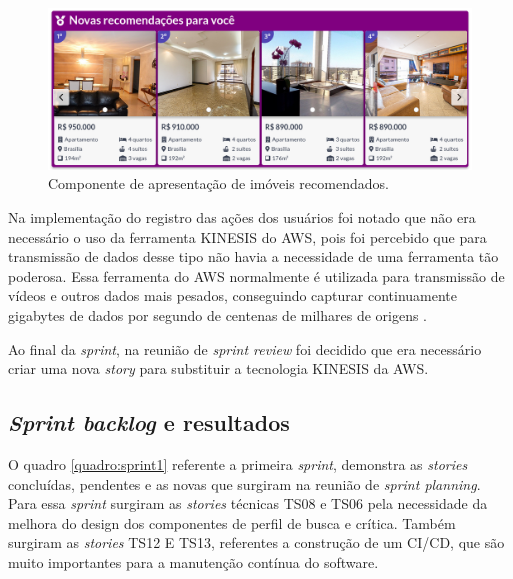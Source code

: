 \begin{figure}[H]
    \centering
    \includegraphics[scale=0.42]{figuras/desenvolvimento/componente_ml.png}
    \caption[Componente de apresentação de imóveis recomendados]{Componente de apresentação de imóveis recomendados.}
    \label{fig:componente_ml}
\end{figure}

Na implementação do registro das ações dos usuários foi notado que não era necessário o uso da ferramenta KINESIS do AWS, pois foi percebido que para transmissão de dados desse tipo não havia a necessidade de uma ferramenta tão poderosa. Essa ferramenta do AWS normalmente é utilizada para transmissão de vídeos e outros dados mais pesados, conseguindo capturar continuamente gigabytes de dados por segundo de centenas de milhares de origens \cite{KINESIS:2019}.

Ao final da \textit{sprint}, na reunião de \textit{sprint review} foi decidido que era necessário criar uma nova \textit{story} para substituir a tecnologia KINESIS da AWS.

\subsection{\textit{Sprint backlog} e resultados}

O quadro \ref{quadro:sprint1} referente a primeira \textit{sprint}, demonstra as \textit{stories} concluídas, pendentes e as novas que surgiram na reunião de \textit{sprint planning}. Para essa \textit{sprint} surgiram as \textit{stories} técnicas TS08 e TS06 pela necessidade da melhora do design dos componentes de perfil de busca e crítica. Também surgiram as \textit{stories} TS12 E TS13, referentes a construção de um CI/CD, que são muito importantes para a manutenção contínua do software.

